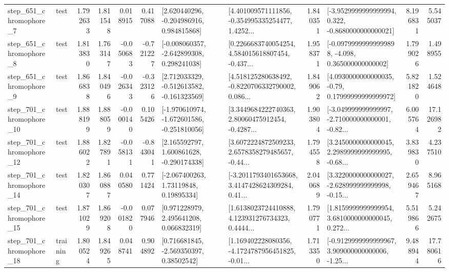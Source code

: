 \begin{tabular}{llrrrrllrlrr}
   step\_651\_chromophore\_7 &      test &      1.792633 &    1.811548 &      0.018915 &  0.417088 &    [2.620440296, -0.204986916, 0.984815868] &  [4.401009571111856, -0.354995335254477, 1.4252... &       1.840351 &  [-3.9529999999999994, 0.322, -0.8680000000000021] &            8.196831 &          5.545037 \\
   step\_651\_chromophore\_8 &      test &      1.813830 &    1.763147 &     -0.050683 & -0.721227 &   [-0.008060357, -2.642899308, 0.298241038] &  [0.2266683740054254, 4.584015618807454, -0.437... &       1.958371 &  [-0.09799999999999898, -4.098, 0.365000000000002] &            1.799026 &          1.498955 \\
   step\_651\_chromophore\_9 &      test &      1.866838 &    1.840496 &     -0.026343 & -0.323126 &   [2.712033329, -0.512613582, -0.161323569] &  [4.518125280638492, -0.8220706332790002, 0.086... &       1.849062 &   [4.0930000000000035, -0.79, 0.17999999999999972] &            5.821820 &          1.524648 \\
  step\_701\_chromophore\_10 &      test &      1.888199 &    1.888059 &     -0.000140 &  0.105426 &  [-1.970610974, -1.672601586, -0.251810056] &  [3.3449684222740363, 2.80060475912454, -0.4287... &       1.903804 &  [-3.049999999999997, -2.710000000000001, -0.82... &            6.005764 &         17.126982 \\
  step\_701\_chromophore\_12 &      test &      1.886022 &    1.827891 &     -0.058131 & -0.843041 &    [2.165592797, 1.600861628, -0.290174338] &  [3.6072224872509233, 2.6578358279485657, -0.44... &       1.794558 &  [3.2450000000000045, 2.2989999999999995, -0.68... &            3.839830 &          4.237510 \\
  step\_701\_chromophore\_14 &      test &      1.820307 &    1.860887 &      0.040580 &  0.771424 &      [-2.067400263, 1.73119848, 0.19895334] &  [-3.2011793401653668, 3.4147428624309284, 0.41... &       2.040689 &  [3.3220000000000027, -2.628999999999998, -0.15... &            2.659467 &          8.965168 \\
  step\_701\_chromophore\_15 &      test &      1.871029 &    1.869208 &     -0.001820 &  0.077946 &     [0.971228979, 2.495641208, 0.066832319] &  [1.6138023724410888, 4.123931276734323, 0.4444... &       1.790771 &  [1.8159999999999954, 3.6810000000000045, 0.272... &            5.519866 &          5.242675 \\
  step\_701\_chromophore\_18 &  training &      1.800524 &    1.849265 &      0.048741 &  0.904892 &     [0.716681845, -2.569350397, 0.38502542] &  [1.169402228080356, -4.1724787956451825, -0.01... &       1.713350 &  [-0.9129999999999967, 3.909000000000006, -1.25... &            9.488944 &         17.780616 \\

\end{tabular}
